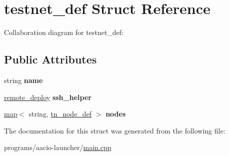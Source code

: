 \hypertarget{structtestnet__def}{}\section{testnet\+\_\+def Struct Reference}
\label{structtestnet__def}


Collaboration diagram for testnet\+\_\+def\+:
\subsection*{Public Attributes}
\begin{DoxyCompactItemize}
\item 
\mbox{\label{structtestnet__def_a893f4afbc96ac803684ef3190ad046df}} 
string {\bfseries name}
\item 
\mbox{\label{structtestnet__def_aa04879cc3aca042aea829a8ca7cdd3b7}} 
\mbox{\hyperlink{structremote__deploy}{remote\+\_\+deploy}} {\bfseries ssh\+\_\+helper}
\item 
\mbox{\label{structtestnet__def_a32627cfabcc23f186c2b01d221e4c241}} 
\mbox{\hyperlink{classstd_1_1map}{map}}$<$ string, \mbox{\hyperlink{classtn__node__def}{tn\+\_\+node\+\_\+def}} $>$ {\bfseries nodes}
\end{DoxyCompactItemize}


The documentation for this struct was generated from the following file\+:\begin{DoxyCompactItemize}
\item 
programs/aacio-\/launcher/\mbox{\hyperlink{programs_2aacio-launcher_2main_8cpp}{main.\+cpp}}\end{DoxyCompactItemize}

